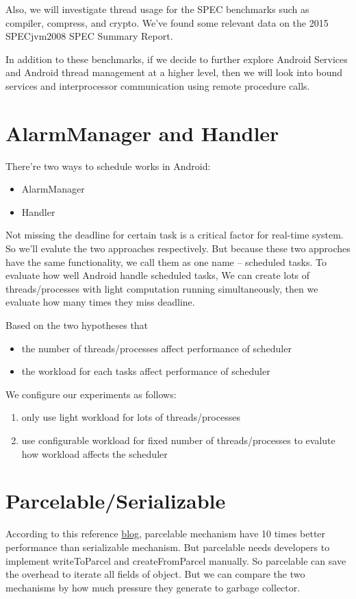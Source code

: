 \documentclass[11pt]{article}
\begin{document}
Also, we will investigate thread usage for the SPEC benchmarks such as compiler, compress, and crypto.  We’ve found some relevant data on the 2015 SPECjvm2008 SPEC Summary Report.

In addition to these benchmarks, if we decide to further explore Android Services and Android thread management at a higher level, then we will look into bound services and interprocessor communication using remote procedure calls.

\section{AlarmManager and Handler}
\label{sec-6}
There're two ways to schedule works in Android:

\begin{itemize}
\item AlarmManager
\item Handler
\end{itemize}

Not missing the deadline for certain task is a critical factor for real-time system.
So we'll evalute the two approaches respectively.
But because these two approches have the same functionality,
we call them as one name -- scheduled tasks.
To evaluate how well Android handle scheduled tasks,
We can create lots of threads/processes with light computation running simultaneously,
then we evaluate how many times they miss deadline.

Based on the two hypotheses that
\begin{itemize}
\item the number of threads/processes affect performance of scheduler
\item the workload for each tasks affect performance of scheduler
\end{itemize}

We configure our experiments as follows:
\begin{enumerate}
\item only use light workload for lots of threads/processes
\item use configurable workload for fixed number of threads/processes to evalute how workload affects the scheduler
\end{enumerate}

\section{\label{Parcelable/Serializable}Parcelable/Serializable}
\label{sec-7}
According to this reference \href{http://www.developerphil.com/parcelable-vs-serializable/}{blog}, parcelable mechanism have 10 times better performance than serializable mechanism.
But parcelable needs developers to implement writeToParcel and createFromParcel manually.
So parcelable can save the overhead to iterate all fields of object.
But we can compare the two mechanisms by how much pressure they generate to garbage collector.
\end{document}

